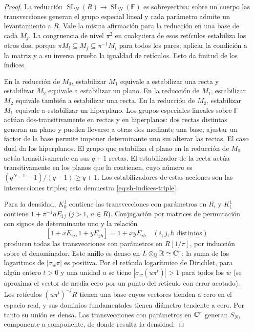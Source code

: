 \begin{proof}
La reducción $\operatorname{SL}_N(R)\to\operatorname{SL}_N(\mathbb F)$ es sobreyectiva: sobre un cuerpo las transvecciones generan el grupo especial lineal y cada parámetro admite un levantamiento a $R$. Vale la misma afirmación para la reducción en una base de cada $M_j$. La congruencia de nivel $\pi^2$ en cualquiera de esos retículos estabiliza los otros dos, porque $\pi M_i\subseteq M_j\subseteq\pi^{-1}M_i$ para todos los pares; aplicar la condición a la matriz y a su inversa prueba la igualdad de retículos. Esto da finitud de los índices.

En la reducción de $M_0$, estabilizar $M_1$ equivale a estabilizar una recta y estabilizar $M_2$ equivale a estabilizar un plano. En la reducción de $M_1$, estabilizar $M_2$ equivale también a estabilizar una recta. En la reducción de $M_2$, estabilizar $M_1$ equivale a estabilizar un hiperplano. Los grupos especiales lineales sobre $\mathbb F$ actúan dos-transitivamente en rectas y en hiperplanos: dos rectas distintas generan un plano y pueden llevarse a otras dos mediante una base; ajustar un factor de la base permite imponer determinante uno sin alterar las rectas. El caso dual da los hiperplanos. El grupo que estabiliza el plano en la reducción de $M_0$ actúa transitivamente en sus $q+1$ rectas. El estabilizador de la recta actúa transitivamente en los planos que la contienen, cuyo número es $(q^{N-1}-1)/(q-1)\ge q+1$. Los estabilizadores de estas acciones son las intersecciones triples; esto demuestra \eqref{eq:sh-indices-triple}.

Para la densidad, $K_0^1$ contiene las transvecciones con parámetros en $R$, y $K_1^1$ contiene $1+\pi^{-1}aE_{1j}$ ($j>1$, $a\in R$). Conjugación por matrices de permutación con signos de determinante uno y la relación
\[
 [1+xE_{ij},1+yE_{jh}]=1+xyE_{ih}\quad(i,j,h\text{ distintos})
\]
producen todas las transvecciones con parámetros en $R[1/\pi]$, por inducción sobre el denominador. Este anillo es denso en $L\otimes_{\mathbb{Q}}\mathbb{R}\simeq\mathbb{C}^r$: la suma de los logaritmos de $|\sigma_w\pi|$ es positiva. Por el retículo logarítmico de Dirichlet, para algún entero $t>0$ y una unidad $u$ se tiene $|\sigma_w(u\pi^t)|>1$ para todos los $w$ (se aproxima el vector de media cero por un punto del retículo con error acotado). Los retículos $(u\pi^t)^{-j}R$ tienen una base cuyos vectores tienden a cero en el espacio real, y sus dominios fundamentales tienen diámetro tendente a cero. Por tanto su unión es densa. Las transvecciones con parámetros en $\mathbb{C}^r$ generan $S_N$, componente a componente, de donde resulta la densidad.
\end{proof}

